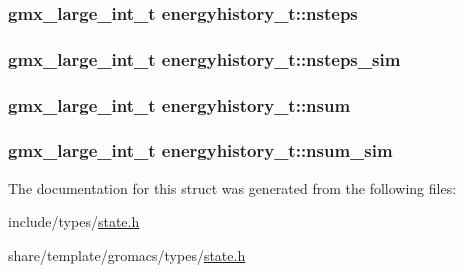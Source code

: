 \hypertarget{structenergyhistory__t_a80718602ffadca988268f68eda97282e}{
\subsubsection[{nsteps}]{\setlength{\rightskip}{0pt plus 5cm}gmx\-\_\-large\-\_\-int\-\_\-t {\bf energyhistory\-\_\-t\-::nsteps}}}\label{structenergyhistory__t_a80718602ffadca988268f68eda97282e}
\hypertarget{structenergyhistory__t_a57825711d19a70a46f4c6010a7f13f2f}{
\subsubsection[{nsteps\-\_\-sim}]{\setlength{\rightskip}{0pt plus 5cm}gmx\-\_\-large\-\_\-int\-\_\-t {\bf energyhistory\-\_\-t\-::nsteps\-\_\-sim}}}\label{structenergyhistory__t_a57825711d19a70a46f4c6010a7f13f2f}
\hypertarget{structenergyhistory__t_ad7e7d44d0a16f607575fbb40e4158606}{
\subsubsection[{nsum}]{\setlength{\rightskip}{0pt plus 5cm}gmx\-\_\-large\-\_\-int\-\_\-t {\bf energyhistory\-\_\-t\-::nsum}}}\label{structenergyhistory__t_ad7e7d44d0a16f607575fbb40e4158606}
\hypertarget{structenergyhistory__t_afac7f1a45c88b7b1440eea58a2a8adef}{
\subsubsection[{nsum\-\_\-sim}]{\setlength{\rightskip}{0pt plus 5cm}gmx\-\_\-large\-\_\-int\-\_\-t {\bf energyhistory\-\_\-t\-::nsum\-\_\-sim}}}\label{structenergyhistory__t_afac7f1a45c88b7b1440eea58a2a8adef}


\-The documentation for this struct was generated from the following files\-:\begin{DoxyCompactItemize}
\item 
include/types/\hyperlink{include_2types_2state_8h}{state.\-h}\item 
share/template/gromacs/types/\hyperlink{share_2template_2gromacs_2types_2state_8h}{state.\-h}\end{DoxyCompactItemize}
